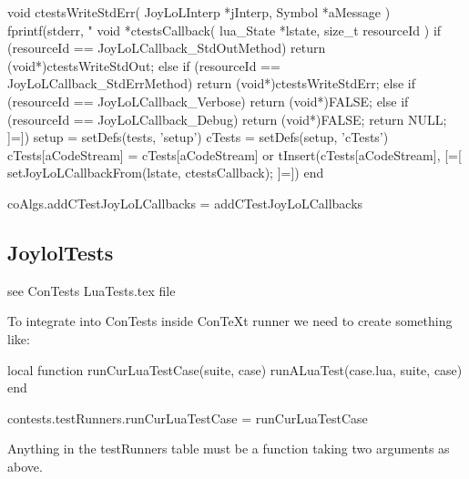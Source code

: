 void ctestsWriteStdErr(
  JoyLoLInterp *jInterp,
  Symbol       *aMessage
) {
  fprintf(stderr, "%
}
void *ctestsCallback(
  lua_State *lstate,
  size_t resourceId
) {
  if (resourceId == JoyLoLCallback_StdOutMethod) {
    return (void*)ctestsWriteStdOut;
  } else if (resourceId == JoyLoLCallback_StdErrMethod) {
    return (void*)ctestsWriteStdErr;
  } else if (resourceId == JoyLoLCallback_Verbose) {
    return (void*)FALSE;
  } else if (resourceId == JoyLoLCallback_Debug) {
    return (void*)FALSE;
  }
  return NULL;
} 
]=])
  setup               = setDefs(tests, 'setup')
  cTests              = setDefs(setup, 'cTests')
  cTests[aCodeStream] = cTests[aCodeStream] or { }
  tInsert(cTests[aCodeStream], [=[
setJoyLoLCallbackFrom(lstate, ctestsCallback);
]=])
end

coAlgs.addCTestJoyLoLCallbacks = addCTestJoyLoLCallbacks
\stopLuaCode

\subsection{JoylolTests}

see ConTests LuaTests.tex file

To integrate into ConTests inside ConTeXt runner we need to create 
something like: 

local function runCurLuaTestCase(suite, case)
  runALuaTest(case.lua, suite, case)
end

contests.testRunners.runCurLuaTestCase = runCurLuaTestCase 

Anything in the testRunners table must be a function taking two arguments 
as above. 

\startMkIVCode
\def\setJoylolVerboseOn{%
  \directlua{thirddata.joylol.setVerbose(true)}
}

\def\setJoylolVerboseOff{%
  \directlua{thirddata.joylol.setVerbose(false)}
}

\def\setJoylolDebuggingOn{%
  \directlua{thirddata.joylol.setDebugging(true)}
}

\def\setJoylolDebuggingOff{%
  \directlua{thirddata.joylol.setVDebugging(false)}
}

\def\setJoylolTracingOn{%
  \directlua{thirddata.joylol.setTracing(true)}
}

\def\setJoylolTracingOff{%
  \directlua{thirddata.joylol.setTracing(false)}
}

\def\setJoylolShowStackOn{%
  \directlua{thirddata.joylol.setShowStack(true)}
}

\def\setJoylolShowStackOff{%
  \directlua{thirddata.joylol.setShowStack(false)}
}

